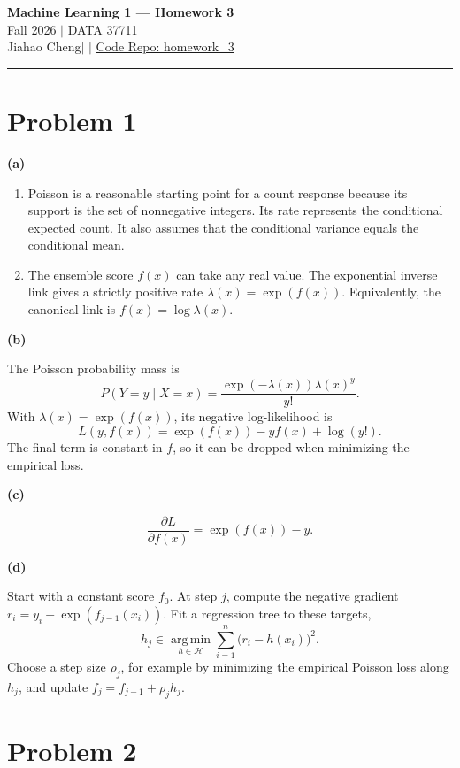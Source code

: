 \documentclass[11pt,letterpaper]{article}
\newcommand{\studentname}{Jiahao Cheng}
\newcommand{\studentid}{12549801}
\newcommand*{\repourl}{} %
\newcommand{\partlabel}[1]{\par\medskip\textbf{(#1)}\par}
\begin{document}
\begin{center}
{\Large\bfseries Machine Learning 1 --- Homework 3}\\[5pt]
Fall 2026 \quad $\vert$ \quad DATA 37711\\[8pt]
\studentname\quad $\vert$ \quad \studentid
\ifx\repourl\empty\else
  \quad $\vert$ \quad \href{\repourl}{Code Repo: homework\_3}
\fi
\end{center}
\hrule
\vspace{8pt}

\section*{Problem 1}

\partlabel{a}
\begin{enumerate}[label=(\roman*),itemsep=0.3em]
    \item Poisson is a reasonable starting point for a count response because its
    support is the set of nonnegative integers. Its rate represents the
    conditional expected count. It also assumes that the conditional variance
    equals the conditional mean.
    \item The ensemble score \(f(x)\) can take any real value. The exponential
    inverse link gives a strictly positive rate \(\lambda(x)=\exp(f(x))\).
    Equivalently, the canonical link is \(f(x)=\log\lambda(x)\).
\end{enumerate}

\partlabel{b}
The Poisson probability mass is
\[
P(Y=y\mid X=x)=\frac{\exp(-\lambda(x))\lambda(x)^y}{y!}.
\]
With \(\lambda(x)=\exp(f(x))\), its negative log-likelihood is
\[
L(y,f(x))=\exp(f(x))-yf(x)+\log(y!).
\]
The final term is constant in \(f\), so it can be dropped when minimizing the
empirical loss.

\partlabel{c}
\[
\frac{\partial L}{\partial f(x)} = \exp(f(x))-y.
\]

\partlabel{d}
Start with a constant score \(f_0\). At step \(j\), compute the negative
gradient \(r_i=y_i-\exp(f_{j-1}(x_i))\). Fit a regression tree to these targets,
\[
h_j \in \operatorname*{arg\,min}_{h\in\mathcal H}
\sum_{i=1}^{n}\bigl(r_i-h(x_i)\bigr)^2.
\]
Choose a step size \(\rho_j\), for example by minimizing the empirical Poisson
loss along \(h_j\), and update \(f_j=f_{j-1}+\rho_j h_j\).

\clearpage
\section*{Problem 2}
\end{document}
